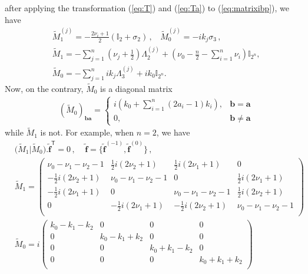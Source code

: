\documentclass[a4paper,11pt]{article}
\newcommand{\nn}{\nonumber}
\def\eqref#1{(\ref{#1})}
\begin{document}
after applying the transformation \eqref{eq:T} and \eqref{eq:Ta}  to \eqref{eq:matrixibp}, we have
\begin{align}
&\tilde{M}_{1}^{(j)}=-\frac{2\nu_i+1}{2}\left(\mathbb{I}_{2}+\sigma_2 \right) \, , ~~~~ \tilde{M}_{0}^{(j)}= - i k_j \sigma_3 \,, \nn\\ 
&\tilde{M}_1= - \sum_{j=1}^n \left(\nu_j+\frac{1}{2}\right) \Lambda_2^{(j)}   + \left(\nu_0-\frac{n}{2}-\sum_{i=1}^n \nu_i\right) \mathbb{I}_{2^n} , \nn\\
&\tilde{M}_0= - \sum_{j=1}^n i k_j \Lambda_3^{(j)} + i k_0 \mathbb{I}_{2^n}.\label{eq:matrixibpntilde}
\end{align} 
Now, on the contrary,  $\tilde{M}_0$ is a diagonal matrix
\begin{align}
&\left(\tilde{M}_0\right)_{\bm{b}\bm{a}}= \begin{cases}
i \left( k_0+\sum_{i=1}^n (2a_i-1)k_i\right) , & \bm{b}=\bm{a} \\
0, & \bm{b}\neq \bm{a}
\end{cases}
\end{align} 
while $\tilde{M}_1$ is not. For example, when $n=2$, we have 
\begin{align}
&\Big(\tilde{M}_1 \Big| \tilde{M}_0 \Big).\bm{\tilde{f}}^{\mathsf{T}}=0\, ,~~~~~\bm{\tilde{f}}=\{\bm{\tilde{f}}^{(-1)},\bm{\tilde{f}}^{(0)}\} \, , \nn\\
&\tilde{M}_1=\left(
\begin{array}{cccc}
 \nu _0-\nu _1-\nu _2-1 & \frac{1}{2} i \left(2 \nu _2+1\right) & \frac{1}{2} i \left(2 \nu _1+1\right) & 0 \\
 -\frac{1}{2} i \left(2 \nu _2+1\right) & \nu _0-\nu _1-\nu _2-1 & 0 & \frac{1}{2} i \left(2 \nu _1+1\right) \\
 -\frac{1}{2} i \left(2 \nu _1+1\right) & 0 & \nu _0-\nu _1-\nu _2-1 & \frac{1}{2} i \left(2 \nu _2+1\right) \\
 0 & -\frac{1}{2} i \left(2 \nu _1+1\right) & -\frac{1}{2} i \left(2 \nu _2+1\right) & \nu _0-\nu _1-\nu _2-1 \\
\end{array}
\right) \nn\\
&\tilde{M}_0= i \left(
\begin{array}{cccc}
 k_0-k_1-k_2 & 0 & 0 & 0 \\
 0 & k_0-k_1+k_2 & 0 & 0 \\
 0 & 0 & k_0+k_1-k_2 & 0 \\
 0 & 0 & 0 & k_0+k_1+k_2 \\
\end{array}
\right)
\end{align} 
\end{document}
